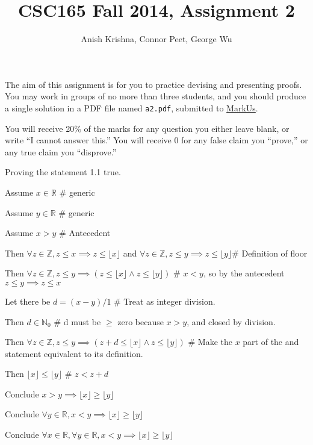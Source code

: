 \documentclass{article}
\title{CSC165 Fall 2014, Assignment 2}
\author{Anish Krishna, Connor Peet, George Wu}
\newcommand{\floor}[1]{\lfloor #1\rfloor}
\begin{document}
\maketitle
\noindent
The aim of this assignment is for you to practice devising and
presenting proofs.  You may work in groups of no more than three
students, and you should produce a single solution in a PDF file named
\texttt{a2.pdf}, submitted to
\href{https://markus.cdf.toronto.edu/csc165-2014-09}{MarkUs}.

You will receive 20\% of the marks for any question you either leave
blank, or write ``I cannot answer this.''  You will receive 0 for any
false claim you ``prove,'' or any true claim you ``disprove.''

\begin{enumerate}
\item Proving the statement 1.1 true.  %
    \begin{description}
    \item Assume $x \in \mathbb{R}$ \# generic
        \begin{description}
        \item Assume $y \in \mathbb{R}$ \# generic
            \begin{description}
            \item Assume $x > y$ \# Antecedent
                \begin{description}
                \item Then $\forall z \in \mathbb{Z}, z \leq x \implies z \leq \floor{x}$ and $\forall z \in \mathbb{Z}, z \leq y \implies z \leq \floor{y}$\# Definition of floor
                \item Then $\forall z \in \mathbb{Z}, z \leq y \implies (z \leq \floor{x} \land z \leq \floor{y})$ \# $x < y$, so by the antecedent $z \leq y \implies z \leq x$
                \item Let there be $d = (x - y) / 1$ \# Treat as integer division.
                \item Then $d \in \mathbb{N}_0$ \# d must be $\geq$ zero because $x > y$, and closed by division.
                \item Then $\forall z \in \mathbb{Z}, z \leq y \implies (z + d \leq \floor{x} \land z \leq \floor{y})$ \# Make the $x$ part of the and statement equivalent to its definition.
                \item Then $\floor{x} \leq \floor{y}$ \# $z < z + d$
                \end{description}
            \item Conclude $x > y \implies \floor{x} \geq \floor{y}$
            \end{description}
        \item Conclude $\forall y \in \mathbb{R}, x < y \implies \floor{x} \geq \floor{y}$
        \end{description}
    \item Conclude $\forall x \in \mathbb{R}, \forall y \in \mathbb{R}, x < y \implies \floor{x} \geq \floor{y}$
    \end{description}


\end{enumerate}
\end{document}
